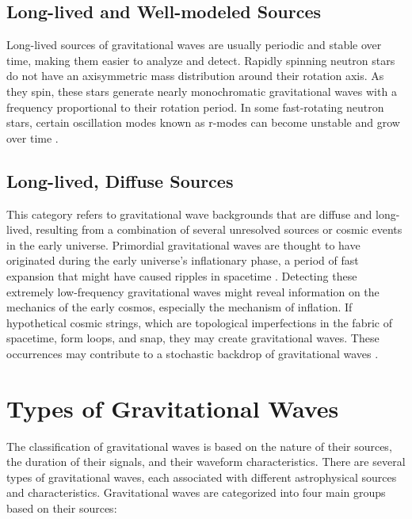 \subsection{Long-lived and Well-modeled Sources}
Long-lived sources of gravitational waves are usually periodic and stable over time, making them easier to analyze and detect. Rapidly spinning neutron stars do not have an axisymmetric mass distribution around their rotation axis. As they spin, these stars generate nearly monochromatic gravitational waves with a frequency proportional to their rotation period. In some fast-rotating neutron stars, certain oscillation modes known as r-modes can become unstable and grow over time \citep{Ho2018-ip}.
\vspace{0.2cm}

\subsection{Long-lived, Diffuse Sources}
This category refers to gravitational wave backgrounds that are diffuse and long-lived, resulting from a combination of several unresolved sources or cosmic events in the early universe. Primordial gravitational waves are thought to have originated during the early universe's inflationary phase, a period of fast expansion that might have caused ripples in spacetime \citep{Guzzetti2016-qv}. Detecting these extremely low-frequency gravitational waves might reveal information on the mechanics of the early cosmos, especially the mechanism of inflation. If hypothetical cosmic strings, which are topological imperfections in the fabric of spacetime, form loops, and snap, they may create gravitational waves. These occurrences may contribute to a stochastic backdrop of gravitational waves \citep{PhysRevD.97.102002}.


\section{Types of Gravitational Waves}
The classification of gravitational waves is based on the nature of their sources, the duration of their signals, and their waveform characteristics. There are several types of gravitational waves, each associated with different astrophysical sources and characteristics.
Gravitational waves are categorized into four main groups based on their sources:

